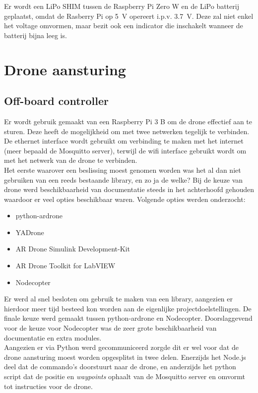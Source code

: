 Er wordt een LiPo SHIM tussen de Raspberry Pi Zero W en de LiPo batterij geplaatst, omdat de Rasberry Pi op \SI{5}{\V} opereert i.p.v. \SI{3.7}{\V}.
Deze zal niet enkel het voltage omvormen, maar bezit ook een indicator die inschakelt wanneer de batterij bijna leeg is.

\section{Drone aansturing} \label{sec:drone_control}
\subsection{Off-board controller} \label{sec:offboard_controller}
Er wordt gebruik gemaakt van een Raspberry Pi 3 B om de drone effectief aan te sturen.
Deze heeft de mogelijkheid om met twee netwerken tegelijk te verbinden.
De ethernet interface wordt gebruikt om verbinding te maken met het internet (meer bepaald de Mosquitto server), terwijl de wifi interface gebruikt wordt om met het netwerk van de drone te verbinden.\\

Het eerste waarover een beslissing moest genomen worden was het al dan niet gebruiken van een reeds bestaande library, en zo ja de welke? Bij de keuze van drone werd beschikbaarheid van documentatie steeds in het achterhoofd gehouden waardoor er veel opties beschikbaar waren. Volgende opties werden onderzocht:
\begin{itemize}
\item python-ardrone
\item YADrone
\item AR Drone Simulink Development-Kit
\item AR Drone Toolkit for LabVIEW
\item Nodecopter
\end{itemize}

Er werd al snel besloten om gebruik te maken van een library, aangezien er hierdoor meer tijd besteed kon worden aan de eigenlijke projectdoelstellingen. De finale keuze werd gemaakt tussen python-ardrone en Nodecopter. Doorslaggevend voor de keuze voor Nodecopter was de zeer grote beschikbaarheid van documentatie en extra modules.\\

Aangezien er via Python werd gecommuniceerd zorgde dit er wel voor dat de drone aansturing moest worden opgesplitst in twee delen. Enerzijds het Node.js deel dat de commando's doorstuurt naar de drone, en anderzijds het python script dat de positie en \textit{waypoints} ophaalt van de Mosquitto server en omvormt tot instructies voor de drone.

